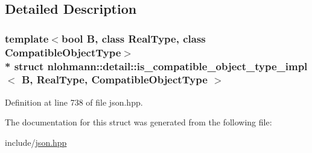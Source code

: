 \subsection{Detailed Description}
\subsubsection*{template$<$bool B, class Real\+Type, class Compatible\+Object\+Type$>$\\*
struct nlohmann\+::detail\+::is\+\_\+compatible\+\_\+object\+\_\+type\+\_\+impl$<$ B, Real\+Type, Compatible\+Object\+Type $>$}



Definition at line 738 of file json.\+hpp.



The documentation for this struct was generated from the following file\+:\begin{DoxyCompactItemize}
\item 
include/\hyperlink{json_8hpp}{json.\+hpp}\end{DoxyCompactItemize}
